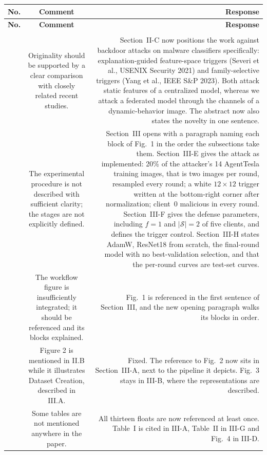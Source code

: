 \documentclass[11pt,a4paper]{article}
\makeatletter
\newcounter{ptno}
\newcommand{\rownum}{\stepcounter{ptno}\theptno}
\newcommand{\grouprow}[1]{\midrule \multicolumn{3}{@{}l@{}}{\textbf{#1}} \\ \midrule}
\makeatother
\begin{document}
\begin{longtable}{@{}NCR@{}}
\toprule
\textbf{No.} & \textbf{Comment} & \textbf{Response} \\
\endfirsthead
\toprule
\textbf{No.} & \textbf{Comment} & \textbf{Response} \\
\midrule
\endhead
\bottomrule
\endfoot

\grouprow{Reviewer A}

\rownum &
Originality should be supported by a clear comparison with closely related recent studies.
&
Section~II-C now positions the work against backdoor attacks on malware classifiers specifically:
explanation-guided feature-space triggers (Severi et al., USENIX Security 2021) and
family-selective triggers (Yang et al., IEEE S\&P 2023). Both attack static features of a
centralized model, whereas we attack a federated model through the channels of a dynamic-behavior
image. The abstract now also states the novelty in one sentence. \\

\rownum &
The experimental procedure is not described with sufficient clarity; the stages are not explicitly
defined.
&
Section~III opens with a paragraph naming each block of Fig.~1 in the order the subsections take
them. Section~III-E gives the attack as implemented: 20\% of the attacker's 14 AgentTesla training
images, that is two images per round, resampled every round; a white $12 \times 12$ trigger written
at the bottom-right corner after normalization; client~0 malicious in every round. Section~III-F
gives the defense parameters, including $f = 1$ and $|\mathcal{S}| = 2$ of five clients, and defines
the trigger control. Section~III-H states AdamW, ResNet18 from scratch, the final-round model with
no best-validation selection, and that the per-round curves are test-set curves. \\

\rownum &
The workflow figure is insufficiently integrated; it should be referenced and its blocks explained.
&
Fig.~1 is referenced in the first sentence of Section~III, and the new opening paragraph walks its
blocks in order. \\

\rownum &
Figure 2 is mentioned in II.B while it illustrates Dataset Creation, described in III.A.
&
Fixed. The reference to Fig.~2 now sits in Section~III-A, next to the pipeline it depicts. Fig.~3
stays in III-B, where the representations are described. \\

\rownum &
Some tables are not mentioned anywhere in the paper.
&
All thirteen floats are now referenced at least once. Table~I is cited in III-A, Table~II in III-G
and Fig.~4 in III-D. \\


\end{longtable}
\end{document}
